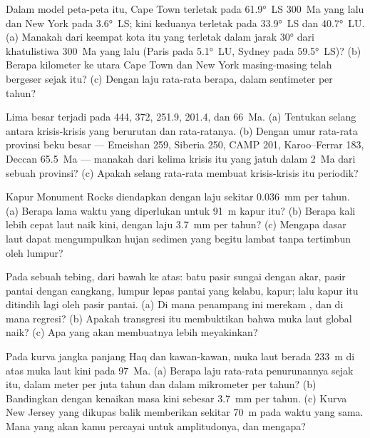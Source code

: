\begin{exercise}[$\star$]\label{exo:b2:phanerozoic-earth:1}
Dalam model peta-peta itu, Cape Town terletak pada \ang{61.9}~LS \qty{300}{Ma} yang lalu dan New York pada
\ang{3.6}~LS; kini keduanya terletak pada \ang{33.9}~LS dan \ang{40.7}~LU. (a) Manakah dari keempat kota itu yang terletak
dalam jarak \ang{30} dari khatulistiwa \qty{300}{Ma} yang lalu (Paris pada \ang{5.1}~LU, Sydney pada
\ang{59.5}~LS)? (b) Berapa kilometer ke utara Cape Town dan New York masing-masing telah bergeser sejak itu?
(c) Dengan laju rata-rata berapa, dalam sentimeter per tahun?
\end{exercise}

\begin{exercise}[$\star$]\label{exo:b2:phanerozoic-earth:2}
Lima besar terjadi pada 444, 372, 251.9, 201.4, dan \qty{66}{Ma}. (a) Tentukan selang antara
krisis-krisis yang berurutan dan rata-ratanya. (b) Dengan umur rata-rata provinsi beku besar ---
Emeishan 259, Siberia 250, CAMP 201, Karoo--Ferrar 183, Deccan \qty{65.5}{Ma} --- manakah dari
kelima krisis itu yang jatuh dalam \qty{2}{Ma} dari sebuah provinsi? (c) Apakah selang rata-rata membuat krisis-krisis itu periodik?
\end{exercise}

\begin{exercise}[$\star$]\label{exo:b2:phanerozoic-earth:3}
Kapur Monument Rocks diendapkan dengan laju sekitar \qty{0.036}{mm} per tahun. (a) Berapa lama waktu yang diperlukan untuk
\qty{91}{m} kapur itu? (b) Berapa kali lebih cepat laut naik kini, dengan laju \qty{3.7}{mm} per
tahun? (c) Mengapa dasar laut dapat mengumpulkan hujan sedimen yang begitu lambat tanpa tertimbun oleh lumpur?
\end{exercise}

\begin{exercise}[$\star$]\label{exo:b2:phanerozoic-earth:4}
Pada sebuah tebing, dari bawah ke atas: batu pasir sungai dengan akar, pasir pantai dengan cangkang, lumpur
lepas pantai yang kelabu, kapur; lalu kapur itu ditindih lagi oleh pasir pantai. (a) Di mana penampang ini merekam
, dan di mana regresi? (b) Apakah transgresi itu membuktikan bahwa muka laut global
naik? (c) Apa yang akan membuatnya lebih meyakinkan?
\end{exercise}

\begin{exercise}[$\star\star$]\label{exo:b2:phanerozoic-earth:5}
Pada kurva jangka panjang Haq dan kawan-kawan, muka laut berada \qty{233}{m} di atas muka laut kini pada
\qty{97}{Ma}. (a) Berapa laju rata-rata penurunannya sejak itu, dalam meter per juta tahun dan dalam
mikrometer per tahun? (b) Bandingkan dengan kenaikan masa kini sebesar \qty{3.7}{mm} per tahun. (c) Kurva New Jersey
yang dikupas balik memberikan sekitar \qty{70}{m} pada waktu yang sama. Mana yang akan kamu percayai untuk
amplitudonya, dan mengapa?
\end{exercise}

